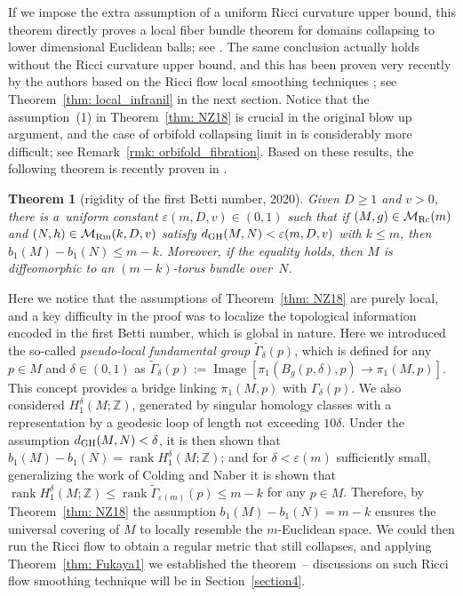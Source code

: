 \documentclass[pdftex]{sigma}
\numberwithin{equation}{section}
\newtheorem{Theorem}{Theorem}[section]
\newcommand{\rank}{\operatorname{rank}}
\begin{document}
If we impose the extra assumption of a uniform Ricci curvature upper bound, this
theorem directly proves a local fiber bundle theorem for domains collapsing to
lower dimensional Euclidean balls; see \cite[Proposition~6.6]{NaberZhang}. The
same conclusion actually holds without the Ricci curvature upper bound, and this
has been proven very recently by the authors based on the Ricci flow local
smoothing techniques \cite[Theorem~1.4]{HW20b}; see Theorem~\ref{thm:
local_infranil} in the next section. Notice that the assumption~(1) in
Theorem~\ref{thm: NZ18} is crucial in the original blow up argument, and the
case of orbifold collapsing limit in \cite[Theorem 1.4]{HW20b} is considerably
more difficult; see Remark~\ref{rmk: orbifold_fibration}. Based on these
results, the following theorem is recently proven in \cite{HW20a}.
\begin{Theorem}[rigidity of the first Betti number, 2020]\label{thm: HW20a}
Given $D\ge 1$ and $v>0$, there is a~uniform constant $\varepsilon(m,D,v)\in
(0,1)$ such that if $(M,g)\in \mathcal{M}_{\rm Rc}(m)$ and $(N,h)\in
\mathcal{M}_{\rm Rm}(k,D,v)$ satisfy $d_{\rm GH}(M,N)<\varepsilon(m,D,v)$ with $k\le
m$, then $b_1(M)-b_1(N)\le m-k$. Moreover, if the equality holds, then $M$ is
diffeomorphic to an $(m-k)$-torus bundle over~$N$.
\end{Theorem}
Here we notice that the assumptions of Theorem~\ref{thm: NZ18} are purely local,
and a key difficulty in the proof was to localize the topological information
encoded in the first Betti number, which is global in nature. Here we
introduced the so-called \emph{pseudo-local fundamental group}
$\tilde{\Gamma}_{\delta}(p)$, which is defined for any $p\in M$ and $\delta\in
(0,1)$ as $\tilde{\Gamma}_{\delta}(p) :=\operatorname{Image}\left[\pi_1(B_g(p,\delta),p)\to
\pi_1(M,p)\right]$. This concept provides a bridge linking $\pi_1(M,p)$ with
$\Gamma_{\delta}(p)$. We also considered $H_1^{\delta}(M; \mathbb{Z})$,
generated by singular homology classes with a representation by a geodesic loop
of length not exceeding $10\delta$. Under the assumption $d_{\rm GH}(M,N)<\delta$,
it is then shown that $b_1(M)-b_1(N)=\rank H_1^{\delta}(M;\mathbb{Z})$; and
for $\delta<\varepsilon(m)$ sufficiently small, generalizing the work of
Colding and Naber \cite{CN12} it is shown that $\rank H_1^{\delta}
(M;\mathbb{Z})\le \rank \tilde{\Gamma}_{\varepsilon(m)}(p)\le m-k$ for any
$p\in M$. Therefore, by Theorem~\ref{thm: NZ18} the assumption
$b_1(M)-b_1(N)=m-k$ ensures the universal covering of $M$ to locally resemble
the $m$-Euclidean space. We could then run the Ricci flow to obtain a regular
metric that still collapses, and applying Theorem~\ref{thm: Fukaya1} we
established the theorem~-- discussions on such Ricci flow smoothing technique
will be in Section~\ref{section4}.
\end{document}
